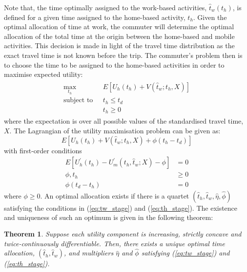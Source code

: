 \documentclass[12pt,a4paper,british]{article}
\newtheorem{theorem}{Theorem}[section]
\begin{document}
Note that, the time optimally assigned to the work-based activities, $\hat{t}_w(t_h)$, is defined for a given time assigned to the home-based activity, $t_h$. Given the optimal allocation of time at work, the commuter will determine the optimal allocation of the total time at the origin between the home-based and mobile activities. This decision is made in light of the travel time distribution as the exact travel time is not known before the trip. The commuter's problem then is to choose the time to be assigned to the home-based activities in order to maximise expected utility:
\begin{align}
\begin{split}
\max_{t_{h}} \quad & E\left[U_{h}\left(t_{h}\right)+V\left(\hat{t}_{w};t_{h}, X\right)\right]\\
\mbox{subject to } \,\, & t_{h} \leq t_{d} \\
& t_h \geq 0
\end{split}
\label{eq:firstStageProblem}
\end{align}
where the expectation is over all possible values of the standardised travel time, $X$. The Lagrangian of the utility maximisation problem can be given as:
\begin{equation*}
E\left[U_{h}\left(t_{h}\right) + V\left(\hat{t}_{w}; t_{h}, X \right) + \phi\left(t_{h} - t_{d} \right)\right]
\end{equation*}
with first-order conditions
\begin{subequations}\label{eq:th_stage}
\begin{align}
E\left[U_{h}^{\prime}\left(t_{h}\right) - U_{m}^{\prime}\left(t_{h} ,\hat{t}_{w}; X\right) - \phi\right] & =0
\label{eq:stage1_wrt_th}\\
\phi,t_{h} & \geq 0
\label{eq:stage1_lambda}\\
\phi\left(t_{d}-t_{h}\right) & =0
\label{eq:stage1_lambdai_const}
\end{align}
\end{subequations}
where $ \phi \geq 0 $. 
An optimal allocation exists if there is a quartet $\left(\hat{t}_{h}, \hat{t}_{w}, \hat{\eta},\hat{\phi}\right)$ satisfying the conditions in (\ref{eq:tw_stage}) and (\ref{eq:th_stage}). The existence and uniqueness of such an optimum is given in the following theorem:
\begin{theorem}
\label{thm:existence_stochastic}
Suppose each utility component is increasing, strictly concave and twice-continuously differentiable. Then, there exists a unique optimal time allocation, $\left(\hat{t}_{h},\hat{t}_{w}\right)$, and multipliers $\hat{\eta}$ and $\hat{\phi}$ satisfying (\ref{eq:tw_stage}) and (\ref{eq:th_stage}).
\end{theorem}
\end{document}
